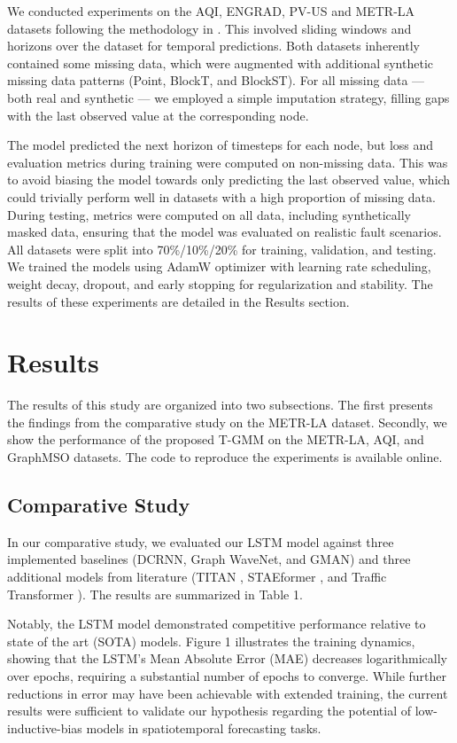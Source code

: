 \documentclass{article}
\theoremstyle{plain}
\theoremstyle{definition}
\theoremstyle{remark}
\begin{document}
We conducted experiments on the AQI, ENGRAD, PV-US and METR-LA datasets following the methodology in \cite{marisca2024graph}. This involved sliding windows and horizons over the dataset for temporal predictions. Both datasets inherently contained some missing data, which were augmented with additional synthetic missing data patterns (Point, BlockT, and BlockST)\cite{marisca2024graph}. For all missing data — both real and synthetic — we employed a simple imputation strategy, filling gaps with the last observed value at the corresponding node. 

The model predicted the next horizon of timesteps for each node, but loss and evaluation metrics during training were computed on non-missing data. This was to avoid biasing the model towards only predicting the last observed value, which could trivially perform well in datasets with a high proportion of missing data.  During testing, metrics were computed on all data, including synthetically masked data, ensuring that the model was evaluated on realistic fault scenarios. All datasets were split into 70\%/10\%/20\% for training, validation, and testing. We trained the models using AdamW optimizer with learning rate scheduling, weight decay, dropout, and early stopping for regularization and stability. The results of these experiments are detailed in the Results section.

\section{Results}

The results of this study are organized into two subsections. The first presents the findings from the comparative study on the METR-LA dataset. Secondly, we show the performance of the proposed T-GMM on the METR-LA, AQI, and GraphMSO datasets. The code to reproduce the experiments is available online. 

\subsection{Comparative Study}
In our comparative study, we evaluated our LSTM model against three implemented baselines (DCRNN, Graph WaveNet, and GMAN) and three additional models from literature (TITAN \cite{wang2024mixturemodel}, STAEformer \cite{liu2023vanillatransformer}, and Traffic Transformer \cite{cai2020traffictransformer}). The results are summarized in Table 1.

Notably, the LSTM model demonstrated competitive performance relative to state of the art (SOTA) models. Figure 1 illustrates the training dynamics, showing that the LSTM’s Mean Absolute Error (MAE) decreases logarithmically over epochs, requiring a substantial number of epochs to converge. While further reductions in error may have been achievable with extended training, the current results were sufficient to validate our hypothesis regarding the potential of low-inductive-bias models in spatiotemporal forecasting tasks.
\end{document}

